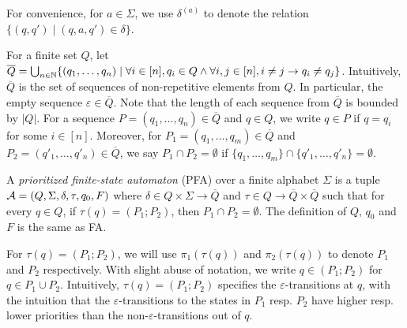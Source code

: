 For convenience, for $a \in \Sigma$, we use $\delta^{(a)}$ to denote the  relation $\{(q, q') \mid (q, a, q') \in \delta\}$.

%
For a finite set $Q$, let $\overline{Q} = \bigcup_{n\in \mathbb{N}}\{ (q_1, \ldots, q_n) \mid \forall i \in [n], q_i \in Q \wedge \forall i,j \in[n], i \neq j \rightarrow q_i \neq q_j \}$. Intuitively, $\overline{Q}$ is the set of sequences of non-repetitive elements from $Q$. In particular, the empty sequence $\varepsilon \in \overline{Q}$. Note that the length of each sequence from $\overline{Q}$ is bounded by  $| Q |$. For a sequence $P = (q_1, \ldots, q_n) \in \overline{Q}$ and  $q \in Q$, we write $q \in P$ if  $q = q_i$ for some $i \in [n]$. Moreover, for $P_1 = (q_1, \ldots, q_m) \in \overline{Q}$ and $P_2 = (q'_1, \ldots, q'_n) \in \overline{Q}$, we say $P_1 \cap P_2 = \emptyset$ if $\{q_1, \ldots, q_m\} \cap \{q'_1, \ldots, q'_n\} = \emptyset$.

\begin{definition}\label{def-pfa}
  A \emph{prioritized finite-state automaton} (PFA) over a finite alphabet $\Sigma$ is a tuple $\mathcal{A}=(Q, \Sigma, \delta, \tau, q_0, F)$ where $\delta \in Q
  \times \Sigma \rightarrow \overline{Q}$ and $\tau \in Q \rightarrow \overline{Q} \times \overline{Q}$ such that for every $q \in Q$, if $\tau(q) = (P_1; P_2)$, then $P_1 \cap P_2 = \emptyset$. 
  The definition of $Q$, $q_0$ and $F$ is the same as FA.
\end{definition}
For $\tau(q) = (P_1; P_2)$, we will use $\pi_1(\tau(q))$ and $\pi_2(\tau(q))$ to denote $P_1$ and $P_2$ respectively.  With slight abuse of notation, we write $q\in (P_1; P_2)$ for $q\in P_1\cup P_2$. Intuitively, $\tau(q)=(P_1; P_2)$ specifies the $\varepsilon$-transitions at $q$, with the intuition that the $\varepsilon$-transitions to the states in $P_1$ resp. $P_2$ have higher resp. lower priorities than the non-$\varepsilon$-transitions out of $q$.
  
